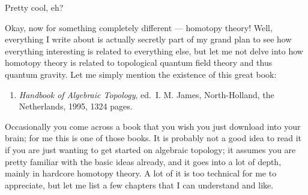 \documentclass{article}
\def\tightlist{}
\begin{document}
Pretty cool, eh?

Okay, now for something completely different --- homotopy theory! Well,
everything I write about is actually secretly part of my grand plan to
see how everything interesting is related to everything else, but let me
not delve into how homotopy theory is related to topological quantum
field theory and thus quantum gravity. Let me simply mention the
existence of this great book:

\begin{enumerate}
\def\labelenumi{\arabic{enumi})}
\setcounter{enumi}{4}
\tightlist
\item
  \emph{Handbook of Algebraic Topology}, ed.~I. M. James, North-Holland,
  the Netherlands, 1995, 1324 pages.
\end{enumerate}

Occasionally you come across a book that you wish you just download into
your brain; for me this is one of those books. It is probably not a good
idea to read it if you are just wanting to get started on algebraic
topology; it assumes you are pretty familiar with the basic ideas
already, and it goes into a lot of depth, mainly in hardcore homotopy
theory. A lot of it is too technical for me to appreciate, but let me
list a few chapters that I can understand and like.
\end{document}
